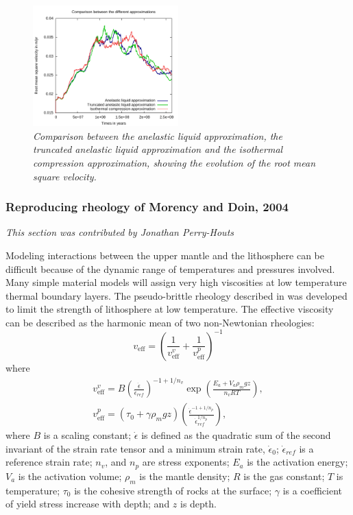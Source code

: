 \documentclass{article}
\begin{document}
\begin{figure}
\centering
  \includegraphics[width=0.5\textwidth]{cookbooks/burnman/vrms.pdf}
  \caption{\it Comparison between the anelastic liquid approximation, 
               the truncated anelastic liquid approximation 
               and the isothermal compression approximation,
               showing the evolution of the root mean square velocity.}
  \label{fig:burnman-vrms}
\end{figure}



\subsubsection{Reproducing rheology of Morency and Doin, 2004}
\label{sec:cookbooks-morency-doin}
\textit{This section was contributed by Jonathan Perry-Houts}

Modeling interactions between the upper mantle and the lithosphere can be difficult because
of the dynamic range of temperatures and pressures involved. Many simple material models
will assign very high viscosities at low temperature thermal boundary layers. The
pseudo-brittle rheology described in \cite{MD04} was developed to limit the strength of
lithosphere at low temperature. The effective viscosity can be described as the harmonic mean
of two non-Newtonian rheologies:
\[v_{\text{eff}} = \left(\frac{1}{v_{\text{eff}}^v}+\frac{1}{v_{\text{eff}}^p}\right)^{-1}\]
where
\begin{align*}
  v_{\text{eff}}^v = B \left(\frac{\dot{\epsilon}}{\dot{\epsilon}_{ref}}\right)^{-1+1/n_v}
  \exp\left(\frac{E_a +V_a \rho_m g z}{n_v R T}\right),
  \\
  v_{\text{eff}}^p = (\tau_0 + \gamma \rho_m g z) \left( \frac{\dot{\epsilon}^{-1+1/n_p}}
  {\dot{\epsilon}_{ref}^{1/n_p}} \right),
\end{align*}
where $B$ is a scaling constant; $\dot{\epsilon}$ is defined as the quadratic sum of the
second invariant of the strain rate tensor and a minimum strain rate, $\dot{\epsilon}_0$;
$\dot{\epsilon}_{ref}$ is a reference strain rate; $n_v$, and $n_p$ are stress exponents;
$E_a$ is the activation energy; $V_a$ is the activation volume; $\rho_m$ is the mantle density;
$R$ is the gas constant; $T$ is temperature; $\tau_0$ is the cohesive strength of rocks at
the surface; $\gamma$ is a coefficient of yield stress increase with depth; and $z$ is depth.
\end{document}
